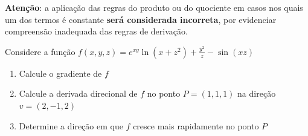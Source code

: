 \documentclass[a4paper,12pt,fleqn]{article}
\begin{document}

\bigskip
\textbf{Atenção}: a aplicação das regras do produto ou do quociente em casos
nos quais um dos termos é constante \textbf{será considerada incorreta},
por evidenciar compreensão inadequada das regras de derivação.

Considere a função
\(
  f(x, y, z) = e^{xy}\ln\left(x+z^2\right) + \frac{y^2}{z} - \sin(xz)
\)
\begin{enumerate}[label=\alph*),nosep]
  \item Calcule o gradiente de $f$

  \item Calcule a derivada direcional de $f$ no ponto
  \(
    P = (1, 1, 1)
  \)
  na direção
  \(
    v = (2, -1, 2)
  \)

  \item Determine a direção em que $f$ cresce mais rapidamente no ponto $P$
\end{enumerate}
\end{document}

